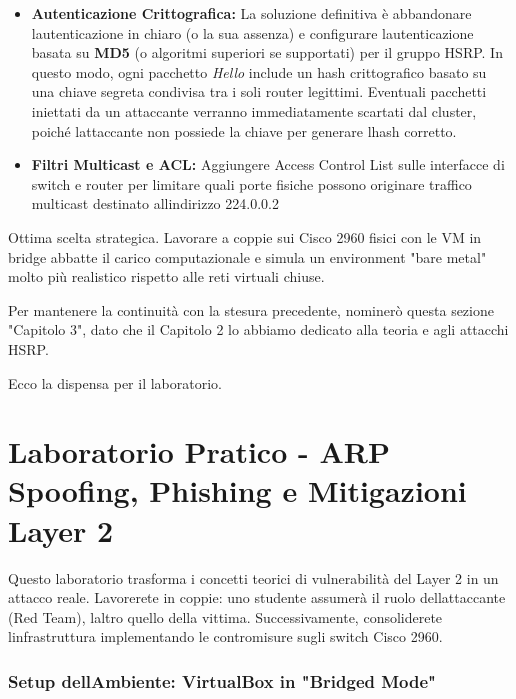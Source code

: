 \documentclass[11pt,a4paper]{article}
\begin{document}
\begin{itemize}
\item
  \textbf{Autenticazione Crittografica:} La soluzione definitiva è
  abbandonare l\textquotesingle autenticazione in chiaro (o la sua
  assenza) e configurare l\textquotesingle autenticazione basata su
  \textbf{MD5} (o algoritmi superiori se supportati) per il gruppo HSRP.
  In questo modo, ogni pacchetto \emph{Hello} include un hash
  crittografico basato su una chiave segreta condivisa tra i soli router
  legittimi. Eventuali pacchetti iniettati da un attaccante verranno
  immediatamente scartati dal cluster, poiché
  l\textquotesingle attaccante non possiede la chiave per generare
  l\textquotesingle hash corretto.
\item
  \textbf{Filtri Multicast e ACL:} Aggiungere Access Control List sulle
  interfacce di switch e router per limitare quali porte fisiche possono
  originare traffico multicast destinato all\textquotesingle indirizzo
  224.0.0.2
\end{itemize}

Ottima scelta strategica. Lavorare a coppie sui Cisco 2960 fisici con le
VM in bridge abbatte il carico computazionale e simula un environment
"bare metal" molto più realistico rispetto alle reti virtuali chiuse.

Per mantenere la continuità con la stesura precedente, nominerò questa
sezione "Capitolo 3", dato che il Capitolo 2 lo abbiamo dedicato alla
teoria e agli attacchi HSRP.

Ecco la dispensa per il laboratorio.

\section{Laboratorio Pratico - ARP Spoofing, Phishing e Mitigazioni
Layer
2}\label{laboratorio-pratico---arp-spoofing-phishing-e-mitigazioni-layer-2}

Questo laboratorio trasforma i concetti teorici di vulnerabilità del
Layer 2 in un attacco reale. Lavorerete in coppie: uno studente assumerà
il ruolo dell\textquotesingle attaccante (Red Team),
l\textquotesingle altro quello della vittima. Successivamente,
consoliderete l\textquotesingle infrastruttura implementando le
contromisure sugli switch Cisco 2960.

\subsubsection{Setup dell\textquotesingle Ambiente: VirtualBox in
"Bridged Mode"}\label{setup-dellambiente-virtualbox-in-bridged-mode}
\end{document}
